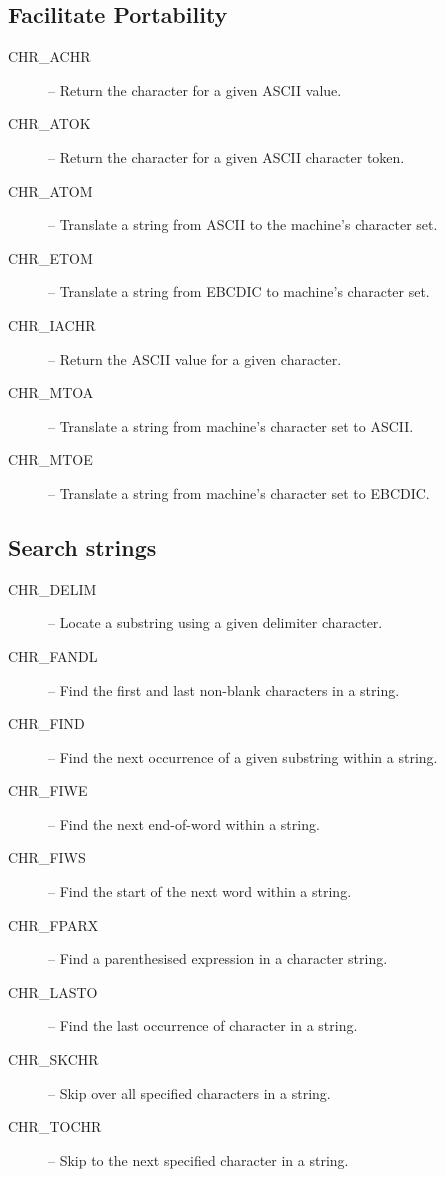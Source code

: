 \subsection{Facilitate Portability}

\begin{description}
\item [CHR\_ACHR] -- Return the character for a given ASCII value.
\item [CHR\_ATOK] -- Return the character for a given ASCII character token.
\item [CHR\_ATOM] -- Translate a string from ASCII to the machine's character
set.
\item [CHR\_ETOM] -- Translate a string from EBCDIC to machine's character set.
\item [CHR\_IACHR] -- Return the ASCII value for a given character.
\item [CHR\_MTOA] -- Translate a string from machine's character set to ASCII.
\item [CHR\_MTOE] -- Translate a string from machine's character set to EBCDIC.
\end{description}


\subsection{Search strings}

\begin {description}
\item [CHR\_DELIM] -- Locate a substring using a given delimiter character.
\item [CHR\_FANDL] -- Find the first and last non-blank characters in a string.
\item [CHR\_FIND] -- Find the next occurrence of a given substring within a string.
\item [CHR\_FIWE] -- Find the next end-of-word within a string.
\item [CHR\_FIWS] -- Find the start of the next word within a string.
\item [CHR\_FPARX] -- Find a parenthesised expression in a character string.
\item [CHR\_LASTO] -- Find the last occurrence of character in a string.
\item [CHR\_SKCHR] -- Skip over all specified characters in a string.
\item [CHR\_TOCHR] -- Skip to the next specified character in a string.
\end {description}


